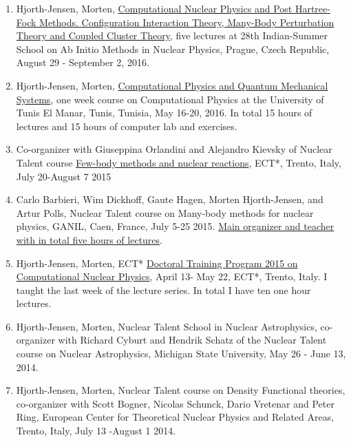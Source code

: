 \documentclass[aps,floatfix,preprint]{revtex4-1}
\begin{document}
\begin{enumerate}
\item Hjorth-Jensen, Morten, \href{{http://rafael.ujf.cas.cz/school}}{Computational Nuclear Physics and Post Hartree-Fock Methods. Configuration Interaction Theory, Many-Body Perturbation Theory and Coupled Cluster Theory}, five lectures at 28th Indian-Summer School on Ab Initio Methods in Nuclear Physics, Prague, Czech Republic, August 29 - September 2, 2016.

\item Hjorth-Jensen, Morten, \href{{http://compphysics.github.io/CompPhysUTunis/doc/web/course.html}}{Computational Physics and Quantum Mechanical Systems}, one week course on Computational Physics at the University of Tunis El Manar, Tunis, Tunisia, May 16-20, 2016. In total 15 hours of lectures and 15 hours of computer lab and exercises. 

\item Co-organizer with Giuseppina Orlandini and Alejandro Kievsky of Nuclear Talent course \href{{https://groups.nscl.msu.edu/jina/talent/wiki/Course_3}}{Few-body methods and nuclear reactions}, ECT*, Trento, Italy, July 20-August 7 2015

\item Carlo Barbieri, Wim Dickhoff, Gaute Hagen, Morten Hjorth-Jensen, and Artur Polls, Nuclear Talent course on Many-body methods for nuclear physics, GANIL, Caen, France, July 5-25 2015. \href{{http://nucleartalent.github.io/Course2ManyBodyMethods/doc/web/course.html}}{Main organizer and teacher with in total five hours of lectures}. 

\item Hjorth-Jensen, Morten, ECT* \href{{http://www.ectstar.eu/node/1287}}{Doctoral Training Program 2015 on Computational Nuclear Physics}, April 13- May 22, ECT*, Trento, Italy. I taught the last week of the lecture series. In total I have ten one hour lectures. 

\item Hjorth-Jensen, Morten, Nuclear Talent School in Nuclear Astrophysics, co-organizer with Richard Cyburt and Hendrik Schatz of the Nuclear Talent course on Nuclear Astrophysics,  Michigan State University, May 26 - June 13, 2014. 

\item Hjorth-Jensen, Morten, Nuclear Talent course on Density Functional theories, co-organizer with Scott Bogner, Nicolas Schunck, Dario Vretenar and Peter Ring, European Center for Theoretical Nuclear Physics and Related Areas, Trento, Italy, July 13 -August 1 2014.


\end{enumerate}
\end{document}
